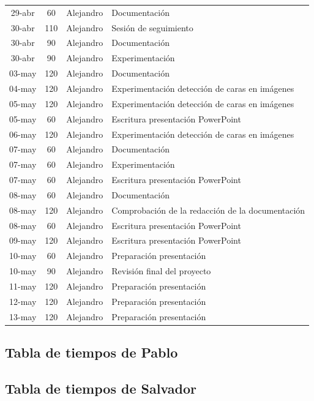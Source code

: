 \documentclass[a4paper]{article}
\begin{document}
\begin{center}
\begin{longtable}{|c|c|c|p{8cm}|}
29-abr & 60  & Alejandro & Documentación \\
30-abr & 110 & Alejandro & Sesión de seguimiento \\
30-abr & 90  & Alejandro & Documentación \\
30-abr & 90  & Alejandro & Experimentación \\
03-may & 120 & Alejandro & Documentación \\
04-may & 120 & Alejandro & Experimentación detección de caras en imágenes \\
05-may & 120 & Alejandro & Experimentación detección de caras en imágenes \\
05-may & 60  & Alejandro & Escritura presentación PowerPoint \\
06-may & 120 & Alejandro & Experimentación detección de caras en imágenes \\
07-may & 60  & Alejandro & Documentación \\
07-may & 60  & Alejandro & Experimentación \\
07-may & 60  & Alejandro & Escritura presentación PowerPoint \\
08-may & 60  & Alejandro & Documentación \\
08-may & 120 & Alejandro & Comprobación de la redacción de la documentación \\
08-may & 60  & Alejandro & Escritura presentación PowerPoint \\
09-may & 120 & Alejandro & Escritura presentación PowerPoint \\
10-may & 60  & Alejandro & Preparación presentación \\
10-may & 90  & Alejandro & Revisión final del proyecto \\
11-may & 120 & Alejandro & Preparación presentación \\
12-may & 120 & Alejandro & Preparación presentación \\
13-may & 120 & Alejandro & Preparación presentación \\
\hline
\end{longtable}
\end{center}

\subsection{Tabla de tiempos de Pablo}

\subsection{Tabla de tiempos de Salvador}
\end{document}
